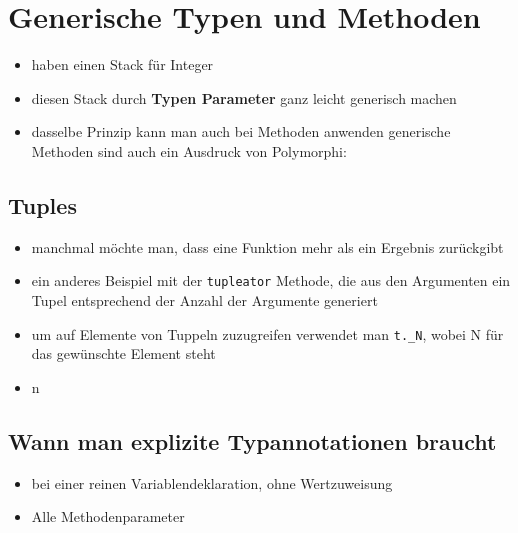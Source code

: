 \section{Generische Typen und Methoden}
\begin{itemize}
  \item haben einen Stack für Integer
  
  
  
  \item diesen Stack durch \textbf{Typen Parameter} ganz leicht generisch machen
  
  
  
  \item dasselbe Prinzip kann man auch bei Methoden anwenden \und generische
  Methoden sind auch ein Ausdruck von Polymorphi:
  
  
\end{itemize}


\subsection{Tuples}
\begin{itemize}
  \item manchmal möchte man, dass eine Funktion mehr als ein Ergebnis
  zurückgibt
  
  
  \item ein anderes Beispiel mit der \texttt{tupleator} Methode, die aus den
  Argumenten ein Tupel entsprechend der Anzahl der Argumente generiert
  
  
  
  \item um auf Elemente von Tuppeln zuzugreifen verwendet man
  \texttt{t.\_N}, wobei N für das gewünschte Element steht
  \item n
\end{itemize}


\subsection{Wann man explizite Typannotationen braucht}
\begin{itemize}
  \item bei einer reinen Variablendeklaration, ohne Wertzuweisung
  \item Alle Methodenparameter
\end{itemize}
\pagebreak


